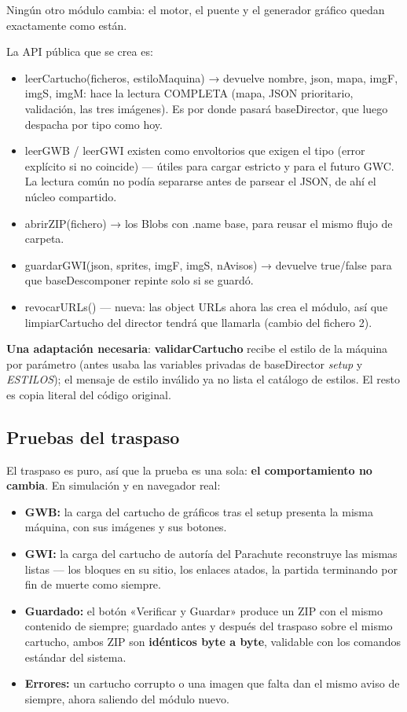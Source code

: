 Ningún otro módulo cambia: el motor, el puente y el generador
gráfico quedan exactamente como están.

La API pública que se crea es:
\begin{itemize}
	\item leerCartucho(ficheros, estiloMaquina) → devuelve {nombre, json, mapa, imgF, imgS, imgM}: hace la lectura COMPLETA (mapa, JSON prioritario, validación, las tres imágenes). Es por donde pasará baseDirector, que luego despacha por tipo como hoy.
	\item leerGWB / leerGWI existen como envoltorios que exigen el tipo (error explícito si no coincide) — útiles para cargar estricto y para el futuro GWC. La lectura común no podía separarse antes de parsear el JSON, de ahí el núcleo compartido.
	\item abrirZIP(fichero) → los Blobs con .name base, para reusar el mismo flujo de carpeta.
	\item guardarGWI(json, sprites, imgF, imgS, nAvisos) → devuelve true/false para que baseDescomponer repinte solo si se guardó.
	\item revocarURLs() — nueva: las object URLs ahora las crea el módulo, así que limpiarCartucho del director tendrá que llamarla (cambio del fichero 2).
\end{itemize}

\textbf{Una adaptación necesaria}: \textbf{validarCartucho} recibe el estilo de la máquina por parámetro (antes usaba las variables privadas de baseDirector \emph{setup} y \emph{ESTILOS}); el mensaje de estilo inválido ya no lista el catálogo de estilos. El resto es copia literal del código original.

\subsection{Pruebas del traspaso}
\label{sec:F5I4Pruebas}

El traspaso es puro, así que la prueba es una sola: \textbf{el
	comportamiento no cambia}. En simulación y en navegador real:

\begin{itemize}
	\item \textbf{GWB:} la carga del cartucho de gráficos tras el
	setup presenta la misma máquina, con sus imágenes y sus botones.
	\item \textbf{GWI:} la carga del cartucho de autoría del
	Parachute reconstruye las mismas listas — los bloques en su
	sitio, los enlaces atados, la partida terminando por fin de
	muerte como siempre.
	\item \textbf{Guardado:} el botón «Verificar y Guardar» produce
	un ZIP con el mismo contenido de siempre; guardado antes y
	después del traspaso sobre el mismo cartucho, ambos ZIP son
	\textbf{idénticos byte a byte}, validable con los comandos
	estándar del sistema.
	\item \textbf{Errores:} un cartucho corrupto o una imagen que
	falta dan el mismo aviso de siempre, ahora saliendo del módulo
	nuevo.
\end{itemize}
